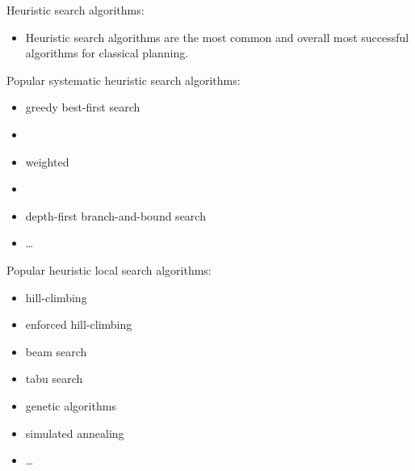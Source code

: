 \documentclass{gkibeamer}
\begin{document}
\begin{frame}{Heuristic search algorithms:
    }
  \begin{itemize}
  \item Heuristic search algorithms are the most common and overall
    most successful algorithms for classical planning.
  \end{itemize}

  \bigskip

  \begin{overprint}
    Popular systematic heuristic search algorithms:
    \begin{itemize}
    \item \alert{greedy best-first search}
    \item \alert{\astar}
    \item \alert{weighted \astar}
    \item {\idastar}
    \item depth-first branch-and-bound search
    \item \dots
    \end{itemize}
    Popular heuristic local search algorithms:
    \begin{itemize}
    \item \alert{hill-climbing}
    \item \alert{enforced hill-climbing}
    \item beam search
    \item tabu search
    \item genetic algorithms
    \item simulated annealing
    \item \dots
    \end{itemize}
  \end{overprint}
\end{frame}
\end{document}
